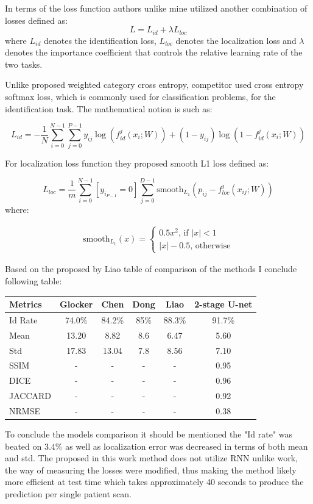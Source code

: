 In terms of the loss function authors unlike mine utilized another combination of losses defined as:
\[L = L_{id} + \lambda L_{loc} \]
where $L_{id}$ denotes the identification loss, $L_{loc}$ denotes the localization loss and $\lambda$ denotes the importance coefficient that controls the relative learning rate of the two tasks. 

Unlike proposed weighted category cross entropy, competitor used  cross entropy softmax loss, which is commonly used for classification problems, for the identification task. The mathematical notion is such as:

\[L_{id}  = - \frac{1}{N} \sum_{i=0}^{N-1}\sum_{j=0}^{P-1} y_{ij} \log (f_{id}^j(x_i; W)) + (1-y_{ij}) \log (1-f_{id}^j(x_i;W)) \]

For localization loss function they proposed smooth L1 loss defined as:

\[ L_{loc} = \frac{1}{m} \sum_{i=0}^{N-1} [y_i_{P-1} = 0] \sum_{j=0}^{D-1} \text{smooth}_L_1 (p_{ij} - f_{loc}^j(x_{ij}; W)) \]
where:

\begin{align*}
\text{smooth}_{L_1}(x) =
\begin{cases}
0.5x^2 \mbox{, if } \lvert x \rvert < 1  \\ 
\lvert x \rvert - 0.5 \mbox{, otherwise} \end{cases}
\end{align*}

Based on the proposed by Liao \cite{Liao2018} table of comparison of the methods I conclude following table:   

\begin{table}[htbp]
\centering
\begin{tabular}{|l|c|c|c|c|c|} \hline
Metrics & Glocker & Chen & Dong & Liao & 2-stage U-net \\ \hline
\hline
Id Rate & 74.0\% & 84.2\% & 85\% & 88.3\% & 91.7\% \\
\hline
Mean & 13.20 & 8.82 & 8.6 & 6.47 & 5.60 \\
\hline
Std & 17.83 & 13.04 & 7.8 & 8.56 & 7.10 \\
\hline
SSIM & - & - & - & - & 0.95 \\ 
\hline
DICE & - & - & - & - & 0.96\\ 
\hline
JACCARD & - & - & - & - & 0.92\\ 
\hline
NRMSE & - & - & - & - & 0.38 \\
\hline
\end{tabular}
\end{table}

To conclude the models comparison it should be mentioned the "Id rate" was beated on $3.4$\% as well as localization error was decreased in terms of both mean and std. The proposed in this work method does not utilize RNN unlike \cite{Liao2018} work, the way of measuring the losses were modified, 
thus making the method likely more efficient at test time which takes approximately 40 seconds to produce the prediction per single patient scan. 